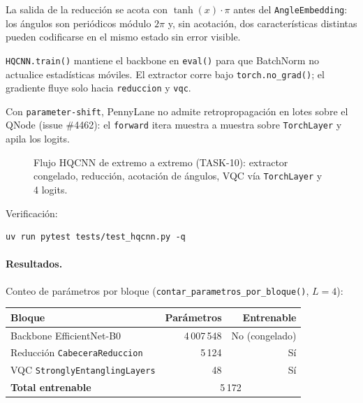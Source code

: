 La salida de la reducción se acota con $\tanh(x)\cdot\pi$ antes del
\texttt{AngleEmbedding}: los ángulos son periódicos módulo $2\pi$ y, sin acotación,
dos características distintas pueden codificarse en el mismo estado sin error visible.

\texttt{HQCNN.train()} mantiene el backbone en \texttt{eval()} para que BatchNorm no
actualice estadísticas móviles. El extractor corre bajo \texttt{torch.no\_grad()};
el gradiente fluye solo hacia \texttt{reduccion} y \texttt{vqc}.

Con \texttt{parameter-shift}, PennyLane no admite retropropagación en lotes sobre el
QNode (issue \#4462): el \texttt{forward} itera muestra a muestra sobre
\texttt{TorchLayer} y apila los logits.

\begin{figure}[ht]
\centering
{}
\caption{Flujo HQCNN de extremo a extremo (TASK-10): extractor congelado, reducción,
acotación de ángulos, VQC vía \texttt{TorchLayer} y 4 logits.}
\label{fig:arquitectura-hqcnn-task10}
\end{figure}

Verificación:
\begin{verbatim}
uv run pytest tests/test_hqcnn.py -q
\end{verbatim}

\paragraph{Resultados.}
Conteo de parámetros por bloque (\texttt{contar\_parametros\_por\_bloque()}, $L=4$):

\begin{center}
\small
\begin{tabular}{lrr}\hline
\textbf{Bloque} & \textbf{Parámetros} & \textbf{Entrenable} \\\hline
Backbone EfficientNet-B0 & 4\,007\,548 & No (congelado) \\
Reducción \texttt{CabeceraReduccion} & 5\,124 & Sí \\
VQC \texttt{StronglyEntanglingLayers} & 48 & Sí \\\hline
\textbf{Total entrenable} & \multicolumn{2}{c}{5\,172} \\\hline
\end{tabular}
\end{center}

